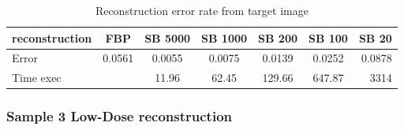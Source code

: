 \documentclass[10pt,a4paper,titlepage]{article}
\begin{document}
		\begin{table}[H]
			\begin{tabular}{ | l || c || c | c | c | c | r | }
 				\hline			
   				reconstruction	& FBP 	& SB 5000	& SB 1000	& SB 200	& SB 100	& SB 20 \\
   				\hline
  				Error			& 0.0561& 0.0055	& 0.0075	& 0.0139	& 0.0252	& 0.0878 \\
 				\hline  
 				Time exec		&		& 11.96		& 62.45		& 129.66	& 647.87	& 3314	\\
 				\hline 
 			\end{tabular}
 			\caption{Reconstruction error rate from target image}
 			\label{tab:Error2000Sample3}
		\end{table}
\clearpage		
		\subsubsection{Sample 3 Low-Dose reconstruction}
\end{document}
